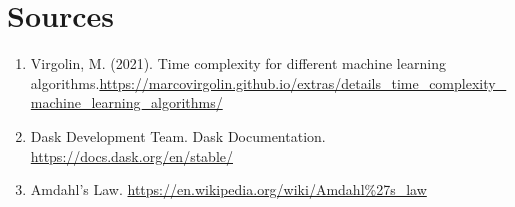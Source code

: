 \documentclass[11pt,a4paper]{article}
\begin{document}
\section{Sources}
\begin{enumerate}
    \item Virgolin, M. (2021). Time complexity for different machine learning algorithms.\url{https://marcovirgolin.github.io/extras/details_time_complexity_machine_learning_algorithms/}
    \item Dask Development Team. Dask Documentation.  \url{https://docs.dask.org/en/stable/}
    \item Amdahl's Law. \url{https://en.wikipedia.org/wiki/Amdahl%27s_law}
\end{enumerate}
\end{document}
